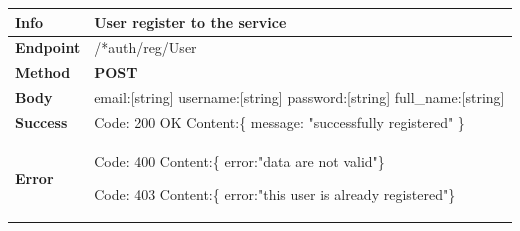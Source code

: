 \begin{table}[H]
\begin{tabular}{|l|p{}|}
\hline
\textbf{Info}             & User register to the service                                                                           \\ \hline
\textbf{Endpoint}    &  /*auth/reg/User\\ \hline
\textbf{Method}         &   \textbf{POST}                                                                            \\ \hline

\textbf{Body}  &   email:[string] \newline
                   username:[string] \newline
                   password:[string] \newline 
                   full\_name:[string]
                    \\ \hline
                    
\textbf{Success} &  Code: 200 OK \newline
                    Content:\{\newline 
                    message: "successfully registered"\newline 
                    \}\\ \hline
\textbf{Error} &  Code: 400 \newline
                  Content:\{\newline
                  error:"data are not valid"\newline\}\newline
                  
                  Code: 403 \newline
                  Content:\{\newline
                  error:"this user is already registered"\newline\}\\\hline

\end{tabular}
\end{table}






